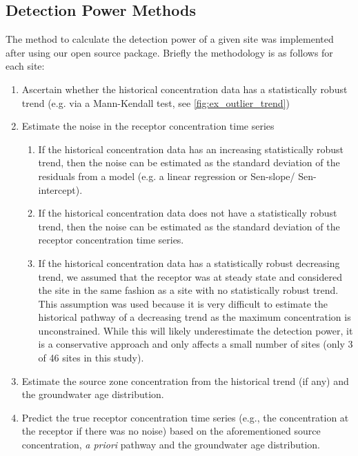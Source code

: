 \subsection[Detection Power Methods] {Detection Power Methods} \label{subsec:detection_power_methods}

The method to calculate the detection power of a given site was implemented after \citet{dumont_determining_nodate}
using our open source package\citep{dumont_komanawagw_detect_power_2023}.
Briefly the methodology is as follows for each site:
\begin{enumerate}
    \item Ascertain whether the historical concentration data has a statistically robust trend (e.g. via a Mann-Kendall test, see \autoref{fig:ex_outlier_trend})
    \item Estimate the noise in the receptor concentration time series
    \begin{enumerate}
        \item If the historical concentration data has an increasing statistically robust trend, then the noise can be estimated as the standard deviation of the residuals from a model (e.g. a linear regression or Sen-slope/ Sen-intercept).
        \item If the historical concentration data does not have a statistically robust trend, then the noise can be estimated as the standard deviation of the receptor concentration time series.
        \item If the historical concentration data has a statistically robust decreasing trend, we assumed that the receptor was at steady state and considered the site in the same fashion as a site with no statistically robust trend. This assumption was used because it is very difficult to estimate the historical pathway of a decreasing trend as the maximum concentration is unconstrained. While this will likely underestimate the detection power, it is a conservative approach and only affects a small number of sites (only 3 of 46 sites in this study).
    \end{enumerate}
    \item Estimate the source zone concentration from the historical trend (if any) and the groundwater age distribution.
    \item Predict the true receptor concentration time series (e.g., the concentration at the receptor if there was no noise) based on the aforementioned source concentration, \textit{a priori} pathway and the groundwater age distribution.

\end{enumerate}
